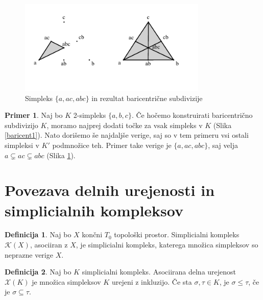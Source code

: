 \documentclass[a4paper, 12pt]{book}
\theoremstyle{definition}
\newtheorem{definition}{Definicija}[section]
\newtheorem{example}{Primer}[section]
\begin{document}
\begin{figure}[h]
  \begin{center}
  \includegraphics[width=0.8\textwidth]{baricentricna2.pdf}
  \end{center}
  \caption{Simpleks $\{a, ac, abc\}$ in rezultat baricentrične subdivizije}
  \label{baricent2}
\end{figure}
\begin{example}
  Naj bo $K$ 2-simpleks $\{a,b,c\}$. Če hočemo konstruirati baricentrično subdivizijo $K$,
  moramo najprej dodati točke za vsak simpleks v $K$ (Slika \ref{baricent1}).
  Nato dorišemo še najdaljše verige, saj so v tem primeru vsi ostali simpleksi v $K'$ podmnožice teh.
  Primer take verige je $\{a, ac, abc\}$, saj velja $a \subsetneq ac \subsetneq abc$ (Slika \ref{baricent2}).
\end{example}

\section{Povezava delnih urejenosti in simplicialnih kompleksov}
\begin{definition}
  Naj bo $X$ končni $T_0$ topološki prostor. Simplicialni kompleks $\mathcal{K}(X)$,
  asociiran z $X$, je simplicialni kompleks, katerega množica simpleksov so neprazne verige $X$.
\end{definition}
\begin{definition}
  Naj bo $K$ simplicialni kompleks. Asociirana delna urejenost $\mathcal{X}(K)$ je
  množica simpleksov $K$ urejeni z inkluzijo. Če sta $\sigma, \tau \in K$,
  je $\sigma \leq \tau$, če je $\sigma \subseteq \tau$.
\end{definition}
\end{document}
